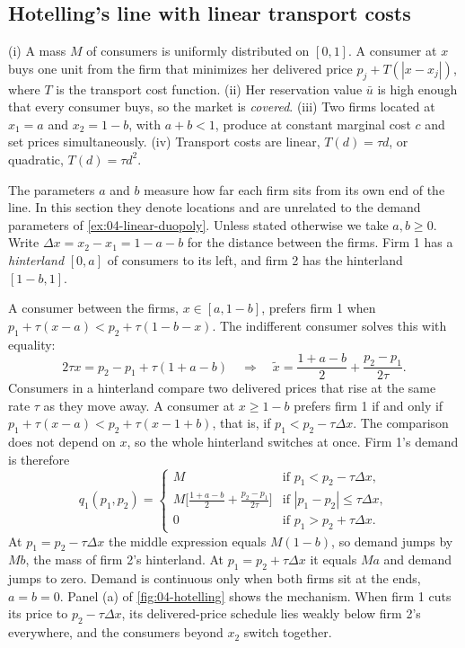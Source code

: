 \subsection{Hotelling's line with linear transport costs}\label{sec:04-hotelling-linear}

\begin{assumption}\label{ass:04-hotelling}
(i) A mass $M$ of consumers is uniformly distributed on $[0,1]$. A consumer at $x$ buys one unit from the firm that
minimizes her delivered price $p_j + T(|x - x_j|)$, where $T$ is the transport cost function. (ii) Her reservation
value $\bar u$ is high enough that every consumer buys, so the market is \emph{covered}. (iii) Two firms located at
$x_1 = a$ and $x_2 = 1 - b$, with $a + b < 1$, produce at constant marginal cost $c$ and set prices simultaneously.
(iv) Transport costs are linear, $T(d) = \tau d$, or quadratic, $T(d) = \tau d^2$.
\end{assumption}

The parameters $a$ and $b$ measure how far each firm sits from its own end of the line. In this section they denote
locations and are unrelated to the demand parameters of \cref{ex:04-linear-duopoly}. Unless stated otherwise we take $a, b \ge 0$. Write $\Delta x = x_2 - x_1 = 1 - a - b$ for the distance between the firms. Firm 1 has a
\emph{hinterland} $[0, a]$ of consumers to its left, and firm 2 has the hinterland $[1 - b, 1]$.

 A consumer between the firms, $x \in [a, 1-b]$, prefers firm 1 when
$p_1 + \tau(x - a) < p_2 + \tau(1 - b - x)$. The indifferent consumer solves this with equality:
\begin{equation*}
2\tau x = p_2 - p_1 + \tau(1 + a - b)
\quad\Longrightarrow\quad
\tilde x = \frac{1 + a - b}{2} + \frac{p_2 - p_1}{2\tau} .
\end{equation*}
Consumers in a hinterland compare two delivered prices that rise at the same rate $\tau$ as they move away. A consumer
at $x \ge 1 - b$ prefers firm 1 if and only if $p_1 + \tau(x - a) < p_2 + \tau(x - 1 + b)$, that is, if
$p_1 < p_2 - \tau\Delta x$. The comparison does not depend on $x$, so the whole hinterland switches at once. Firm 1's
demand is therefore
\begin{equation}\label{eq:04-hotelling-linear-demand}
q_1(p_1, p_2) =
\begin{cases}
M & \text{if } p_1 < p_2 - \tau\Delta x,\\[2pt]
M\Big[\frac{1 + a - b}{2} + \frac{p_2 - p_1}{2\tau}\Big] & \text{if } |p_1 - p_2| \le \tau\Delta x,\\[2pt]
0 & \text{if } p_1 > p_2 + \tau\Delta x .
\end{cases}
\end{equation}
At $p_1 = p_2 - \tau\Delta x$ the middle expression equals $M(1 - b)$, so demand jumps by $Mb$, the mass of firm 2's
hinterland. At $p_1 = p_2 + \tau\Delta x$ it equals $Ma$ and demand jumps to zero. Demand is continuous only when
both firms sit at the ends, $a = b = 0$. Panel (a) of \cref{fig:04-hotelling} shows the mechanism. When firm 1
cuts its price to $p_2 - \tau\Delta x$, its delivered-price schedule lies weakly below firm 2's everywhere, and the
consumers beyond $x_2$ switch together.

